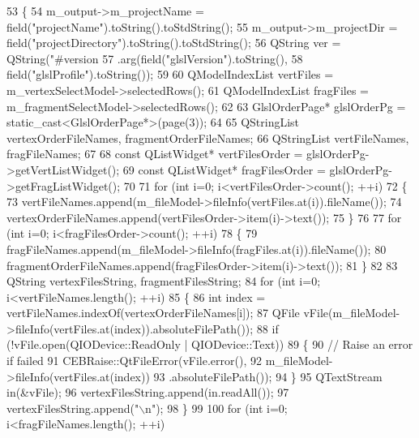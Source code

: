 \begin{DoxyCode}
53 \{
54   m_output->m_projectName = field(\textcolor{stringliteral}{"projectName"}).toString().toStdString();
55   m_output->m_projectDir = field(\textcolor{stringliteral}{"projectDirectory"}).toString().toStdString();
56   QString ver = QString(\textcolor{stringliteral}{"#version %
57                 .arg(field(\textcolor{stringliteral}{"glslVersion"}).toString(),
58                      field(\textcolor{stringliteral}{"glslProfile"}).toString());
59 
60   QModelIndexList vertFiles = m_vertexSelectModel->selectedRows();
61   QModelIndexList fragFiles = m_fragmentSelectModel->selectedRows();
62 
63   GlslOrderPage* glslOrderPg = \textcolor{keyword}{static\_cast<}GlslOrderPage*\textcolor{keyword}{>}(page(3));
64 
65   QStringList vertexOrderFileNames, fragmentOrderFileNames;
66   QStringList vertFileNames, fragFileNames;
67 
68   \textcolor{keyword}{const} QListWidget* vertFilesOrder = glslOrderPg->getVertListWidget();
69   \textcolor{keyword}{const} QListWidget* fragFilesOrder = glslOrderPg->getFragListWidget();
70 
71   \textcolor{keywordflow}{for} (\textcolor{keywordtype}{int} i=0; i<vertFilesOrder->count(); ++i)
72   \{
73     vertFileNames.append(m_fileModel->fileInfo(vertFiles.at(i)).fileName());
74     vertexOrderFileNames.append(vertFilesOrder->item(i)->text());
75   \}
76 
77   \textcolor{keywordflow}{for} (\textcolor{keywordtype}{int} i=0; i<fragFilesOrder->count(); ++i)
78   \{
79     fragFileNames.append(m_fileModel->fileInfo(fragFiles.at(i)).fileName());
80     fragmentOrderFileNames.append(fragFilesOrder->item(i)->text());
81   \}
82 
83   QString vertexFilesString, fragmentFilesString;
84   \textcolor{keywordflow}{for} (\textcolor{keywordtype}{int} i=0; i<vertFileNames.length(); ++i)
85   \{
86     \textcolor{keywordtype}{int} index = vertFileNames.indexOf(vertexOrderFileNames[i]);
87     QFile vFile(m_fileModel->fileInfo(vertFiles.at(index)).absoluteFilePath());
88     \textcolor{keywordflow}{if} (!vFile.open(QIODevice::ReadOnly | QIODevice::Text))
89     \{
90       \textcolor{comment}{// Raise an error if failed}
91       CEBRaise::QtFileError(vFile.error(),
92                             m_fileModel->fileInfo(vertFiles.at(index))
93                                                            .absoluteFilePath());
94     \}
95     QTextStream in(&vFile);
96     vertexFilesString.append(in.readAll());
97     vertexFilesString.append(\textcolor{stringliteral}{"\(\backslash\)n"});
98   \}
99 
100   \textcolor{keywordflow}{for} (\textcolor{keywordtype}{int} i=0; i<fragFileNames.length(); ++i)
}
\end{DoxyCode}

